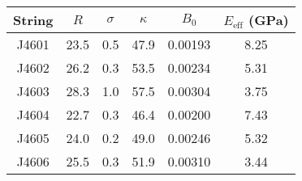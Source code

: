 \begin{tabular}{cccccc}
\toprule
String & $R$ & $\sigma$ & $\kappa$ & $B_0$ & $E_\mathrm{eff}$ (GPa) \\
\midrule
J4601 & 23.5 & 0.5 & 47.9 & 0.00193 & 8.25 \\
J4602 & 26.2 & 0.3 & 53.5 & 0.00234 & 5.31 \\
J4603 & 28.3 & 1.0 & 57.5 & 0.00304 & 3.75 \\
J4604 & 22.7 & 0.3 & 46.4 & 0.00200 & 7.43 \\
J4605 & 24.0 & 0.2 & 49.0 & 0.00246 & 5.32 \\
J4606 & 25.5 & 0.3 & 51.9 & 0.00310 & 3.44 \\
\bottomrule
\end{tabular}

